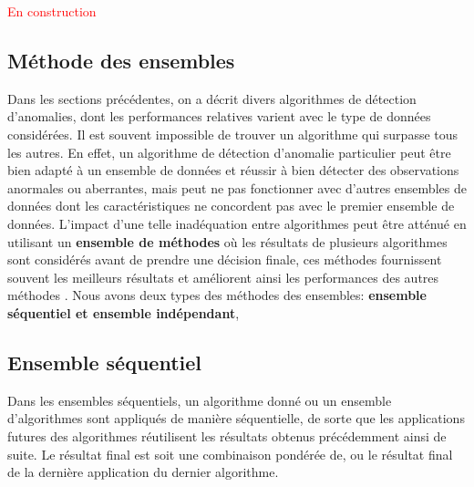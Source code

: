  
 
 
 
 
 \textcolor{red}{En construction}\\
% 
%
\subsection{Méthode des ensembles}
%
%
Dans les sections précédentes, on a décrit divers algorithmes de détection d’anomalies, dont les performances relatives varient avec le type de données considérées. Il est souvent  impossible de trouver un algorithme qui surpasse tous les autres. En effet, un algorithme de détection d'anomalie particulier peut être bien adapté à un ensemble de données et réussir à bien détecter des observations anormales ou aberrantes, mais peut ne pas fonctionner avec d’autres ensembles de données dont les caractéristiques ne concordent pas avec le premier ensemble de données. L'impact d'une telle inadéquation  entre algorithmes peut être atténué en utilisant un \textbf{ ensemble  de méthodes} où les résultats de plusieurs algorithmes sont considérés avant de prendre une décision finale, ces méthodes fournissent souvent les meilleurs résultats et améliorent ainsi les performances des autres méthodes \cite{A10}. Nous avons deux types des méthodes des ensembles: \textbf{ensemble séquentiel et ensemble indépendant}, \newl
\subsection*{Ensemble séquentiel }
Dans les ensembles séquentiels, un algorithme donné ou un ensemble d'algorithmes sont
appliqués de manière séquentielle, de sorte que les applications futures des algorithmes
réutilisent les résultats obtenus précédemment ainsi de suite. Le résultat final est soit une combinaison pondérée de, ou le résultat final de la dernière application du dernier algorithme. 

